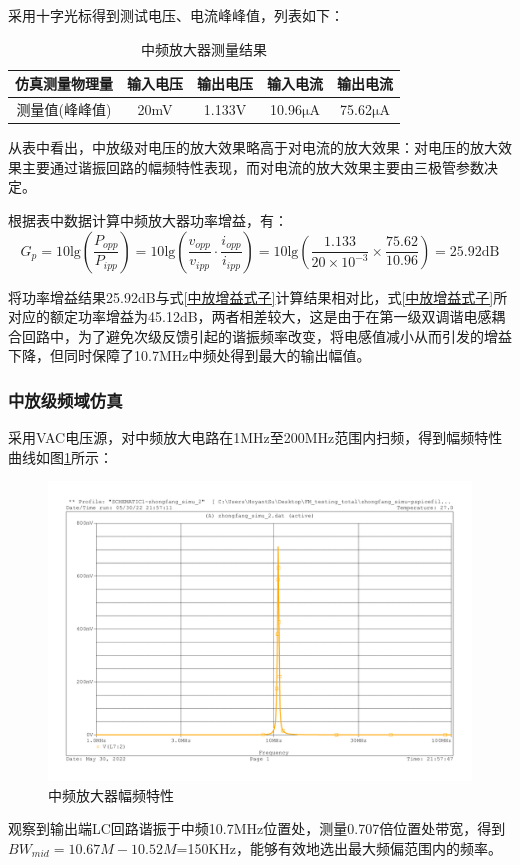 \documentclass[a4paper,12pt,twoside]{article}
\begin{document}
采用十字光标得到测试电压、电流峰峰值，列表如下：
\begin{table}[H]
    \centering
    \begin{tabular}{ccccc}
    \toprule[1.2pt]
    \midrule
        仿真测量物理量 & 输入电压& 输出电压& 输入电流& 输出电流  \\
        \midrule
        测量值(峰峰值) & 20mV&1.133V&10.96$\mathrm{\mu}$A&75.62$\mathrm{\mu}$A\\
        \bottomrule[1.2pt]
    \end{tabular}
    \caption{中频放大器测量结果}
    \label{中频测量}
\end{table}
从表中看出，中放级对电压的放大效果略高于对电流的放大效果：对电压的放大效果主要通过谐振回路的幅频特性表现，而对电流的放大效果主要由三极管参数决定。

根据表中数据计算中频放大器功率增益，有：
\begin{equation}
    G_p=10\mathrm{lg}(\frac{P_{opp}}{P_{ipp}})=10\mathrm{lg}(\frac{v_{opp}}{v_{ipp}}\cdot\frac{i_{opp}}{i_{ipp}})=10\mathrm{lg}(\frac{1.133}{20\times 10^{-3}}\times \frac{75.62}{10.96})=25.92\mathrm{dB}
    \label{式27}
\end{equation}

将功率增益结果25.92dB与式\ref{中放增益式子}计算结果相对比，式\ref{中放增益式子}所对应的额定功率增益为45.12dB，两者相差较大，这是由于在第一级双调谐电感耦合回路中，为了避免次级反馈引起的谐振频率改变，将电感值减小从而引发的增益下降，但同时保障了10.7MHz中频处得到最大的输出幅值。%

\subsubsection{中放级频域仿真}
采用VAC电压源，对中频放大电路在1MHz至200MHz范围内扫频，得到幅频特性曲线如图\ref{中放幅频}所示：
\begin{figure}[H]
    \centering
    \includegraphics[scale=0.32]{中放仿真频域.pdf}
    \caption{中频放大器幅频特性}
    \label{中放幅频}
\end{figure}
观察到输出端LC回路谐振于中频10.7MHz位置处，测量0.707倍位置处带宽，得到$BW_{mid}=10.67M-10.52M$=150KHz，能够有效地选出最大频偏范围内的频率。
\end{document}
